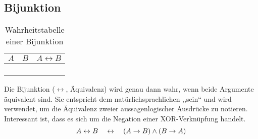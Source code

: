 \subsection{Bijunktion}
%
\begin{table}[ht]
 \begin{center}
  \begin{tabular}{cc|c}
   \hline
    $A$ & $B$ & $A \leftrightarrow{} B$ \\
   \hline \hline
    \F  & \F  & \T \\
    \F  & \T  & \F \\
    \T  & \F  & \F \\
    \T  & \T  & \T \\
  \end{tabular}
  \caption{Wahrheitstabelle einer Bijunktion}
  \label{fig:bijunction_operator}
 \end{center}
\end{table}
%
Die Bijunktion ($\leftrightarrow$, Äquivalenz) wird genau dann wahr, wenn beide Argumente äquivalent sind. Sie entspricht dem natürlichsprachlichen ,,sein`` und wird verwendet, um die Äquivalenz zweier aussagenlogischer Ausdrücke zu notieren. Interessant ist, dass es sich um die Negation einer XOR-Verknüpfung handelt. %
%
\begin{equation}
  A \leftrightarrow B  \quad\leftrightarrow\quad (A \rightarrow B) \land (B \rightarrow A)
\end{equation}
%
